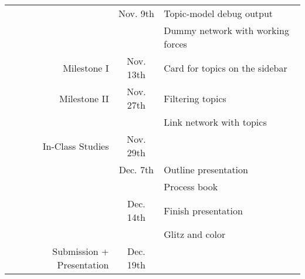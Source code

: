 \begin{tabular}{|r|c|l|}
	\hline
	                          &  Nov. 9th & Topic-model debug output \\
														&           & Dummy network with working forces\\\hline
	              Milestone I & Nov. 13th & Card for topics on the sidebar \\\hline
							 Milestone II & Nov. 27th & Filtering topics \\
														&           & Link network with topics \\\hline
					 In-Class Studies & Nov. 29th & \\\hline
	                          &  Dec. 7th & Outline presentation \\
														&           & Process book \\\hline
	                          & Dec. 14th & Finish presentation \\
														&           & Glitz and color \\\hline
	Submission + Presentation & Dec. 19th & \\\hline
\end{tabular}


